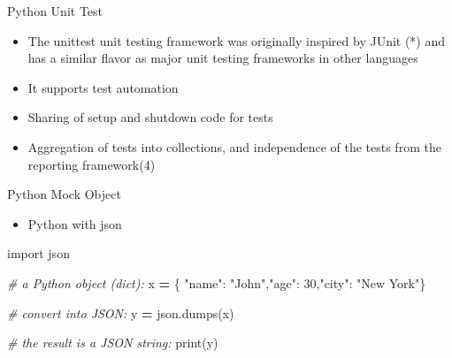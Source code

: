 \documentclass[
  ignorenonframetext,
]{beamer}
\newenvironment{Shaded}{\begin{snugshade}}{\end{snugshade}}
\newcommand{\BuiltInTok}[1]{#1}
\newcommand{\CommentTok}[1]{\textcolor[rgb]{0.56,0.35,0.01}{\textit{#1}}}
\newcommand{\DecValTok}[1]{\textcolor[rgb]{0.00,0.00,0.81}{#1}}
\newcommand{\ImportTok}[1]{#1}
\newcommand{\NormalTok}[1]{#1}
\newcommand{\OperatorTok}[1]{\textcolor[rgb]{0.81,0.36,0.00}{\textbf{#1}}}
\newcommand{\StringTok}[1]{\textcolor[rgb]{0.31,0.60,0.02}{#1}}
\providecommand{\tightlist}{%
  \setlength{\itemsep}{0pt}\setlength{\parskip}{0pt}}
\begin{document}
\begin{frame}{Python Unit Test}
\protect\hypertarget{python-unit-test}{}
\begin{itemize}
\tightlist
\item
  The unittest unit testing framework was originally inspired by JUnit
  (*) and has a similar flavor as major unit testing frameworks in other
  languages
\item
  It supports test automation
\item
  Sharing of setup and shutdown code for tests
\item
  Aggregation of tests into collections, and independence of the tests
  from the reporting framework(4)
\end{itemize}
\end{frame}

\begin{frame}[fragile]{Python Mock Object}
\protect\hypertarget{python-mock-object}{}
\begin{itemize}
\tightlist
\item
  Python with json
\end{itemize}

\begin{Shaded}
\begin{Highlighting}[]
\ImportTok{import}\NormalTok{ json}

\CommentTok{\# a Python object (dict):}
\NormalTok{x }\OperatorTok{=}\NormalTok{ \{  }\StringTok{"name"}\NormalTok{: }\StringTok{"John"}\NormalTok{,}\StringTok{"age"}\NormalTok{: }\DecValTok{30}\NormalTok{,}\StringTok{"city"}\NormalTok{: }\StringTok{"New York"}\NormalTok{\}}

\CommentTok{\# convert into JSON:}
\NormalTok{y }\OperatorTok{=}\NormalTok{ json.dumps(x)}

\CommentTok{\# the result is a JSON string:}
\BuiltInTok{print}\NormalTok{(y)}
\end{Highlighting}
\end{Shaded}
\end{frame}
\end{document}
